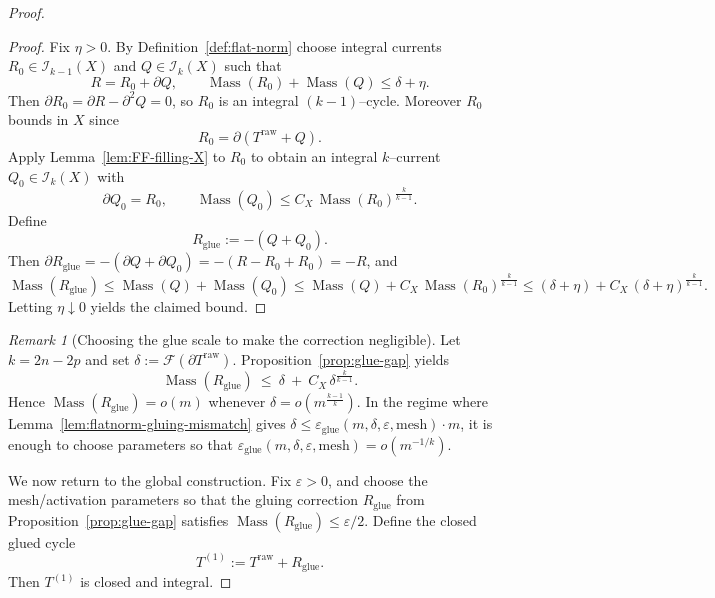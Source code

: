 \documentclass[11pt]{article}
\numberwithin{equation}{section}  %
\theoremstyle{plain}
\theoremstyle{definition}
\theoremstyle{remark}
\newtheorem{remark}[theorem]{Remark}
\DeclareMathOperator{\Mass}{Mass}
\begin{document}
\begin{proof}
\begin{proof}
Fix $\eta>0$. By Definition~\ref{def:flat-norm} choose integral currents $R_0\in\mathcal I_{k-1}(X)$ and $Q\in\mathcal I_k(X)$ such that
\[
R=R_0+\partial Q,\qquad \Mass(R_0)+\Mass(Q)\le \delta+\eta .
\]
Then $\partial R_0=\partial R-\partial^2Q=0$, so $R_0$ is an integral $(k-1)$--cycle. Moreover $R_0$ bounds in $X$ since
\[
R_0=\partial(T^{\mathrm{raw}}+Q).
\]
Apply Lemma~\ref{lem:FF-filling-X} to $R_0$ to obtain an integral $k$--current $Q_0\in\mathcal I_k(X)$ with
\[
\partial Q_0 = R_0,\qquad \Mass(Q_0)\le C_X\,\Mass(R_0)^{\frac{k}{k-1}}.
\]
Define
\[
R_{\mathrm{glue}}:=-(Q+Q_0).
\]
Then $\partial R_{\mathrm{glue}}=-(\partial Q+\partial Q_0)=-(R-R_0+R_0)=-R$, and
\[
\Mass(R_{\mathrm{glue}})\le \Mass(Q)+\Mass(Q_0)
\le \Mass(Q)+C_X\,\Mass(R_0)^{\frac{k}{k-1}}
\le (\delta+\eta)+C_X\,(\delta+\eta)^{\frac{k}{k-1}}.
\]
Letting $\eta\downarrow 0$ yields the claimed bound.
\end{proof}




\begin{remark}[Choosing the glue scale to make the correction negligible]\label{rem:glue-scaling}\label{rem:glue-gap-remark}
Let $k=2n-2p$ and set $\delta:=\mathcal F(\partial T^{\mathrm{raw}})$.
Proposition~\ref{prop:glue-gap} yields
\[
\Mass(R_{\mathrm{glue}})\ \le\ \delta\ +\ C_X\,\delta^{\frac{k}{k-1}}.
\]
Hence $\Mass(R_{\mathrm{glue}})=o(m)$ whenever $\delta=o\!\left(m^{\frac{k-1}{k}}\right)$.
In the regime where Lemma~\ref{lem:flatnorm-gluing-mismatch} gives $\delta\le \varepsilon_{\mathrm{glue}}(m,\delta,\varepsilon,\mathrm{mesh})\cdot m$,
it is enough to choose parameters so that $\varepsilon_{\mathrm{glue}}(m,\delta,\varepsilon,\mathrm{mesh})=o\!\left(m^{-1/k}\right)$.
\end{remark}









We now return to the global construction.
Fix $\varepsilon>0$, and choose the mesh/activation parameters so that the gluing correction $R_{\mathrm{glue}}$ from
Proposition~\ref{prop:glue-gap} satisfies $\Mass(R_{\mathrm{glue}})\le\varepsilon/2$.
Define the closed glued cycle
\[
T^{(1)}:=T^{\mathrm{raw}}+R_{\mathrm{glue}}.
\]
Then $T^{(1)}$ is closed and integral.


\end{proof}
\end{document}
